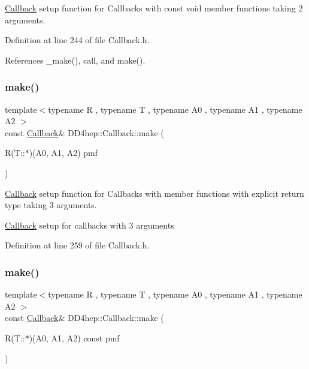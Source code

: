 \hyperlink{class_d_d4hep_1_1_callback}{Callback} setup function for Callbacks with const void member functions taking 2 arguments. 



Definition at line 244 of file Callback.\+h.



References \+\_\+make(), call, and make().

\hypertarget{class_d_d4hep_1_1_callback_aa3478e8f6f51ee606ad83ee0f7a7421d}{}\label{class_d_d4hep_1_1_callback_aa3478e8f6f51ee606ad83ee0f7a7421d} 
\subsubsection{\texorpdfstring{make()}{make()}\hspace{0.1cm}{\footnotesize\ttfamily [13/17]}}
{\footnotesize\ttfamily template$<$typename R , typename T , typename A0 , typename A1 , typename A2 $>$ \\
const \hyperlink{class_d_d4hep_1_1_callback}{Callback}\& D\+D4hep\+::\+Callback\+::make (\begin{DoxyParamCaption}\item[{R(T\+::$\ast$)(A0, A1, A2)}]{pmf }\end{DoxyParamCaption})\hspace{0.3cm}{\ttfamily [inline]}}



\hyperlink{class_d_d4hep_1_1_callback}{Callback} setup function for Callbacks with member functions with explicit return type taking 3 arguments. 

\hyperlink{class_d_d4hep_1_1_callback}{Callback} setup for callbacks with 3 arguments 

Definition at line 259 of file Callback.\+h.

\hypertarget{class_d_d4hep_1_1_callback_ab48c821d293aed53a590faf4566ad28f}{}\label{class_d_d4hep_1_1_callback_ab48c821d293aed53a590faf4566ad28f} 
\subsubsection{\texorpdfstring{make()}{make()}\hspace{0.1cm}{\footnotesize\ttfamily [14/17]}}
{\footnotesize\ttfamily template$<$typename R , typename T , typename A0 , typename A1 , typename A2 $>$ \\
const \hyperlink{class_d_d4hep_1_1_callback}{Callback}\& D\+D4hep\+::\+Callback\+::make (\begin{DoxyParamCaption}\item[{R(T\+::$\ast$)(A0, A1, A2) const}]{pmf }\end{DoxyParamCaption})\hspace{0.3cm}{\ttfamily [inline]}}



